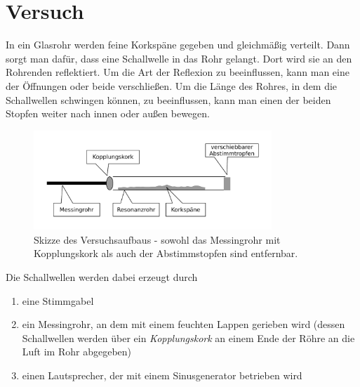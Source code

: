 % 
% 
% 
% 
% 
% 


		\section{Versuch}



In ein Glasrohr werden feine Korkspäne gegeben und gleichmäßig verteilt. Dann sorgt man dafür, dass eine Schallwelle in das Rohr gelangt. Dort wird sie an den Rohrenden reflektiert. Um die Art der Reflexion zu beeinflussen, kann man eine der Öffnungen oder beide verschließen. Um die Länge des Rohres, in dem die Schallwellen schwingen können, zu beeinflussen, kann man einen der beiden Stopfen weiter nach innen oder außen bewegen.


\begin{figure}[h]
	\centering
	\includegraphics[width=0.8\textwidth]{praktika/mat_praktika/aufbau}
	\caption{Skizze des Versuchsaufbaus - sowohl das Messingrohr mit Kopplungskork als auch der Abstimmstopfen sind entfernbar.}
\end{figure}
Die Schallwellen werden dabei erzeugt durch 
\begin{enumerate}
	\item eine Stimmgabel 
	\item ein Messingrohr, an dem mit einem feuchten Lappen gerieben wird (dessen Schallwellen werden über ein \textit{Kopplungskork} an einem Ende der Röhre an die Luft im Rohr abgegeben)
	\item einen Lautsprecher, der mit einem Sinusgenerator betrieben wird
\end{enumerate}

